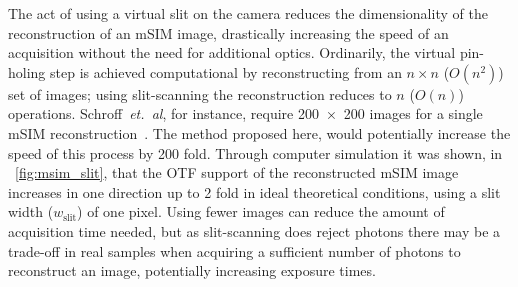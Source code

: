 The act of using a virtual slit on the camera reduces the dimensionality of the reconstruction of an \gls{mSIM} image, drastically increasing the speed of an acquisition without the need for additional optics.
Ordinarily, the virtual pin-holing step is achieved computational by reconstructing from an \(n\times n\) (\(O(n^2)\)) set of images; using \gls{slit-scanning} the reconstruction reduces to \(n \) (\(O(n)\)) operations.
Schroff~\emph{et.~al}, for instance, require \SI{200x200}{} images for a single \gls{mSIM} reconstruction~\cite{yorkResolutionDoublingLive2012}.
The method proposed here, would potentially increase the speed of this process by \SI{200}{} fold.
Through computer simulation it was shown, in \figurename~\ref{fig:msim_slit}, that the \gls{OTF} support of the reconstructed \gls{mSIM} image increases in one direction up to \SI{2}{} fold in ideal theoretical conditions, using a slit width (\(w_{\text{slit}}\)) of one pixel.
Using fewer images can reduce the amount of acquisition time needed, but as \gls{slit-scanning} does reject photons there may be a trade-off in real samples when acquiring a sufficient number of photons to reconstruct an image, potentially increasing exposure times.

